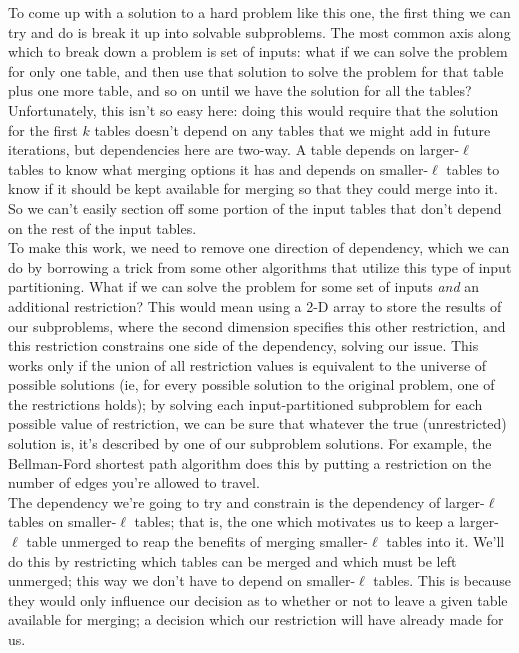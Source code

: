 \documentclass{article}[12]
\begin{document}
To come up with a solution to a hard problem like this one, the first thing we can try and do is break it up into solvable subproblems. The most common axis along which to break down a problem is set of inputs: what if we can solve the problem for only one table, and then use that solution to solve the problem for that table plus one more table, and so on until we have the solution for all the tables? Unfortunately, this isn't so easy here: doing this would require that the solution for the first $k$ tables doesn't depend on any tables that we might add in future iterations, but dependencies here are two-way. A table depends on larger-$\ell$ tables to know what merging options it has and depends on smaller-$\ell$ tables to know if it should be kept available for merging so that they could merge into it. So we can't easily section off some portion of the input tables that don't depend on the rest of the input tables.\\

To make this work, we need to remove one direction of dependency, which we can do by borrowing a trick from some other algorithms that utilize this type of input partitioning. What if we can solve the problem for some set of inputs \textit{and} an additional restriction? This would mean using a 2-D array to store the results of our subproblems, where the second dimension specifies this other restriction, and this restriction constrains one side of the dependency, solving our issue. This works only if the union of all restriction values is equivalent to the universe of possible solutions (ie, for every possible solution to the original problem, one of the restrictions holds); by solving each input-partitioned subproblem for each possible value of restriction, we can be sure that whatever the true (unrestricted) solution is, it's described by one of our subproblem solutions. For example, the Bellman-Ford shortest path algorithm does this by putting a restriction on the number of edges you're allowed to travel.\\

The dependency we're going to try and constrain is the dependency of larger-$\ell$ tables on smaller-$\ell$ tables; that is, the one which motivates us to keep a larger-$\ell$ table unmerged to reap the benefits of merging smaller-$\ell$ tables into it. We'll do this by restricting which tables can be merged and which must be left unmerged; this way we don't have to depend on smaller-$\ell$ tables. This is because they would only influence our decision as to whether or not to leave a given table available for merging; a decision which our restriction will have already made for us.\\
\end{document}
